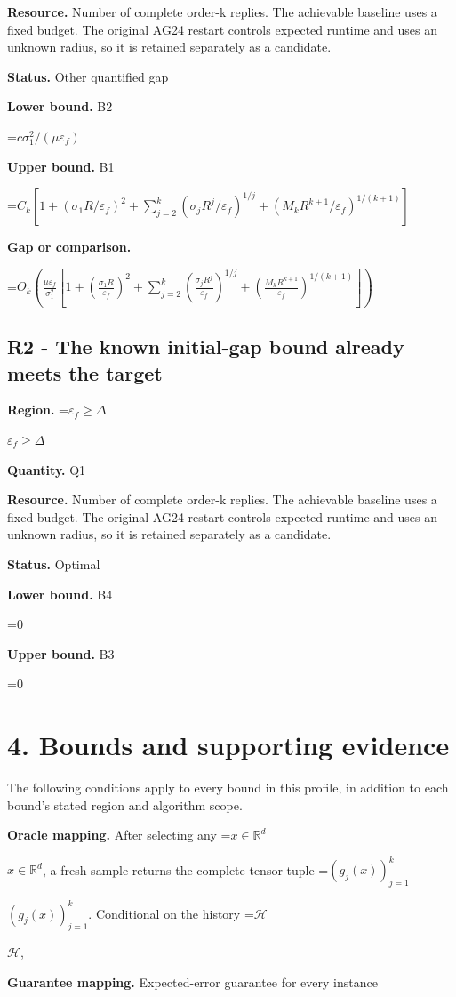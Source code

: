 \documentclass[10pt,a4paper]{article}
\newcommand{\AtlasMath}[1]{\par\begingroup\centering\setbox0=\hbox{$\displaystyle #1$}\ifdim\wd0>1.4\linewidth\typeout{ATLAS WIDE FORMULA: \the\wd0}\fi\ifdim\wd0>\linewidth\resizebox{\linewidth}{!}{\box0}\else\box0\fi\par\endgroup}
\newcommand{\AtlasInlineMath}[1]{\begingroup\setbox0=\hbox{$#1$}\ifdim\wd0>.4\linewidth\endgroup\AtlasMath{#1}\else\endgroup$#1$\fi}
\begin{document}
\textbf{Resource.} Number of complete order-k replies. The achievable baseline uses a fixed budget. The original AG24 restart controls expected runtime and uses an unknown radius, so it is retained separately as a candidate.

\textbf{Status.} Other quantified gap

\textbf{Lower bound.} B2

\AtlasMath{c\sigma_1^2/(\mu\varepsilon_f)}
\textbf{Upper bound.} B1

\AtlasMath{C_k[1+(\sigma_1R/\varepsilon_f)^2+\sum_{j=2}^k(\sigma_jR^j/\varepsilon_f)^{1/j}+(M_kR^{k+1}/\varepsilon_f)^{1/(k+1)}]}
\textbf{Gap or comparison.} 
\AtlasMath{O_k\!\left(\frac{\mu\varepsilon_f}{\sigma_1^2}\left[1+\left(\frac{\sigma_1R}{\varepsilon_f}\right)^2+\sum_{j=2}^{k}\left(\frac{\sigma_jR^j}{\varepsilon_f}\right)^{1/j}+\left(\frac{M_kR^{k+1}}{\varepsilon_f}\right)^{1/(k+1)}\right]\right)}


\subsection{R2 - The known initial-gap bound already meets the target}
\textbf{Region.} \AtlasInlineMath{\varepsilon_f\ge\Delta}

\textbf{Quantity.} Q1

\textbf{Resource.} Number of complete order-k replies. The achievable baseline uses a fixed budget. The original AG24 restart controls expected runtime and uses an unknown radius, so it is retained separately as a candidate.

\textbf{Status.} Optimal

\textbf{Lower bound.} B4

\AtlasMath{0}
\textbf{Upper bound.} B3

\AtlasMath{0}
\section{4. Bounds and supporting evidence}
The following conditions apply to every bound in this profile, in addition to each bound's stated region and algorithm scope.

\textbf{Oracle mapping.} After selecting any \AtlasInlineMath{x\in\mathbb{R}^d}, a fresh sample returns the complete tensor tuple \AtlasInlineMath{(g_j(x))_{j=1}^k}. Conditional on the history \AtlasInlineMath{\mathcal{H}},

\textbf{Guarantee mapping.} Expected-error guarantee for every instance
\end{document}
